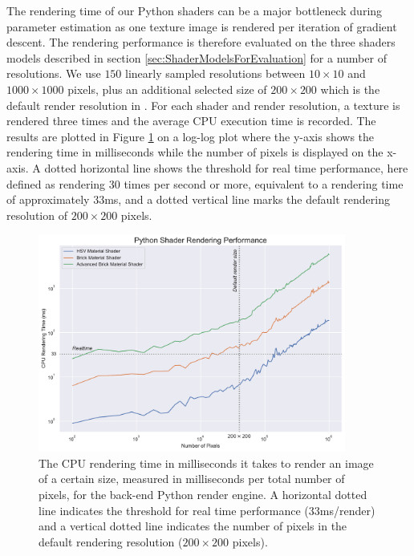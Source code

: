 The rendering time of our Python shaders can be a major bottleneck during parameter estimation as one texture image is rendered per iteration of gradient descent. The rendering performance is therefore evaluated on the three shaders models described in section \ref{sec:ShaderModelsForEvaluation} for a number of resolutions. We use $150$ linearly sampled resolutions between $10\times10$ and $1000\times1000$ pixels, plus an additional selected size of $200\times200$ which is the default render resolution in \dipter{}. For each shader and render resolution, a texture is rendered three times and the average CPU execution time is recorded. The results are plotted in Figure \ref{fig:PythonRenderingPerformance} on a log-log plot where the y-axis shows the rendering time in milliseconds while the number of pixels is displayed on the x-axis. A dotted horizontal line shows the threshold for real time performance, here defined as rendering 30 times per second or more, equivalent to a rendering time of approximately 33ms, and a dotted vertical line marks the default rendering resolution of $200\times 200$ pixels.

\begin{figure}[h]
    \centering
    \includegraphics[width=0.9\textwidth]{img/evaluation/PythonRenderingPerformance.pdf}
    \caption{The CPU rendering time in milliseconds it takes to render an image of a certain size, measured in milliseconds per total number of pixels, for the back-end Python render engine. A horizontal dotted line indicates the threshold for real time performance ($33$ms/render) and a vertical dotted line indicates the number of pixels in the default rendering resolution ($200\times 200$ pixels).}
    \label{fig:PythonRenderingPerformance}
\end{figure}

